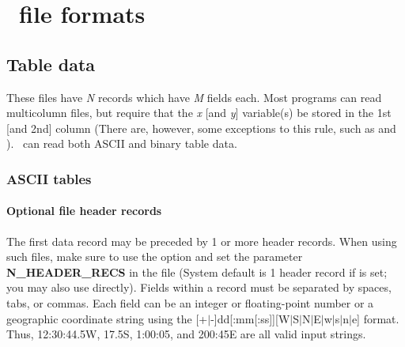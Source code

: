%
%

\chapter{\gmt\ file formats}
\thispagestyle{headings}

\section{Table data} 

These files have {\it N} records which have {\it M} fields each.
Most programs can read multicolumn files, but require that the
{\it x} [and {\it y}] variable(s) be stored in the 1st [and 2nd]
column (There are, however, some exceptions to this rule, such as
 and ).  \GMT\ can read both ASCII and
binary table data.

\subsection{ASCII tables}
\subsubsection{Optional file header records}
The first data record may be preceded by 1 or more header records.
When using such files, make sure to use the  option and set
the parameter {\bf N\_HEADER\_RECS} in the  file
(System default is 1 header record if  is set; you may also
use  directly).  Fields
within a record must be separated by spaces, tabs, or commas.
Each field can be an integer or floating-point number or a geographic
coordinate string using the [+$|$-]dd[:mm[:ss]][W$|$S$|$N$|$E$|$w$|$s$|$n$|$e] format.
Thus, 12:30:44.5W, 17.5S, 1:00:05, and 200:45E are all valid input strings.
